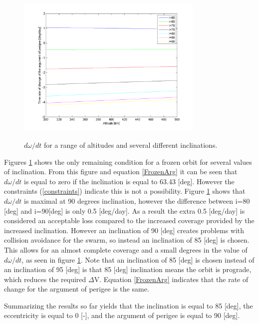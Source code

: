 \begin{figure}
\centering
\includegraphics[width=0.8\textwidth, angle=0]{chapters/img/AltVsOmdot.png}
\label{fig:AltVsOmdot}
\caption{$d\omega/dt$ for a range of altitudes and several different inclinations.}
\end{figure}

Figures \ref{fig:AltVsOmdot} shows the only remaining condition for a frozen orbit for several values of inclination. From this figure and equation \ref{FrozenArg} it can be seen that $d\omega/dt$ is equal to zero if the inclination is equal to 63.43 [deg]. However the constraints (\ref{constraints}) indicate this is not a possibility. Figure \ref{fig:AltVsOmdot} shows that $d\omega/dt$ is maximal at 90 degrees inclination, however the difference between i=80 [deg] and i=90[deg] is only 0.5 [deg/day]. As a result the extra 0.5 [deg/day] is considered an acceptable loss compared to the increased coverage provided by the increased inclination. However an inclination of 90 [deg] creates problems with collision avoidance for the swarm, so instead an inclination of 85 [deg] is chosen. This allows for an almost complete coverage and a small degrees in the value of $d\omega/dt$, as seen in figure \ref{fig:AltVsOmdot}. Note that an inclination of 85 [deg] is chosen instead of an inclination of 95 [deg] is that 85 [deg] inclination means the orbit is prograde, which reduces the required $\Delta$V. Equation \ref{FrozenArg} indicates that the rate of change for the argument of perigee is the same.

Summarizing the results so far yields that the inclination is equal to 85 [deg], the eccentricity is equal to 0 [-], and the argument of perigee is equal to 90 [deg].